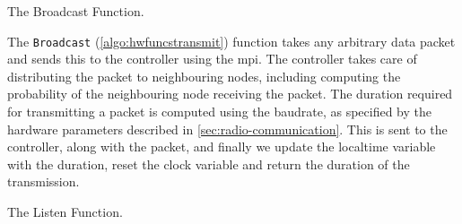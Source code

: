 \begin{algorithm}[ht]
    \DontPrintSemicolon
    

    \caption{The Broadcast Function.}
    \label{algo:hwfuncstransmit}
\end{algorithm}

The \texttt{Broadcast} (\autoref{algo:hwfuncstransmit}) function takes any arbitrary data packet and sends this to the controller using the \gls{mpi}. The controller takes care of distributing the packet to neighbouring nodes, including computing the probability of the neighbouring node receiving the packet. The duration required for transmitting a packet is computed using the baudrate, as specified by the hardware parameters described in \autoref{sec:radio-communication}. This is sent to the controller, along with the packet, and finally we update the localtime variable with the duration, reset the clock variable and return the duration of the transmission.\medbreak

\begin{algorithm}[ht]
    \DontPrintSemicolon
    
    
    \caption{The Listen Function.}
    \label{algo:hwfuncslisten}
\end{algorithm}

